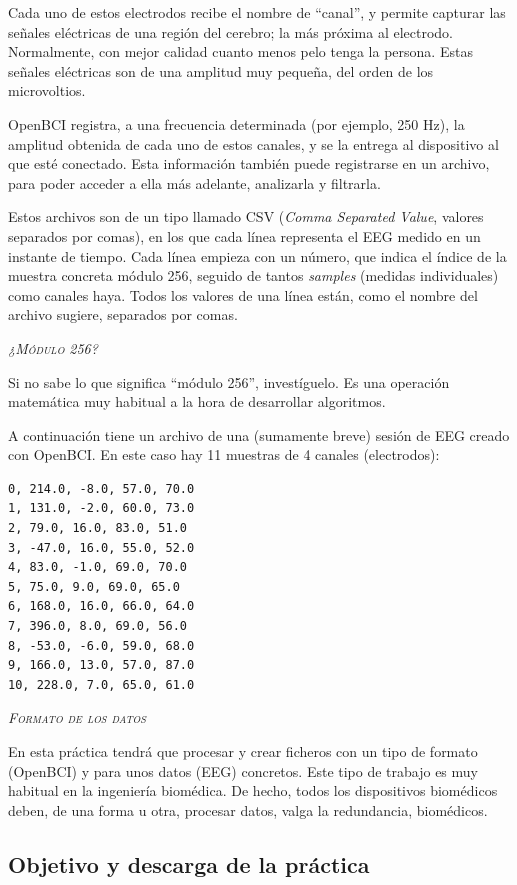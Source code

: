 \documentclass[10pt,a4paper,spanish]{article}
\newcommand{\sombreado}[2]{
  \begin{shaded}
    \begin{center} \emph{\textsc{#1}} \end{center}
    \noindent #2\\
  \end{shaded}
}
\begin{document}
Cada uno de estos electrodos recibe el nombre de ``canal'', y permite capturar las señales eléctricas de una región del cerebro; la más próxima al electrodo. Normalmente, con mejor calidad cuanto menos pelo tenga la persona. Estas señales eléctricas son de una amplitud muy pequeña, del orden de los microvoltios.

OpenBCI registra, a una frecuencia determinada (por ejemplo, 250 Hz), la amplitud obtenida de cada uno de estos canales, y se la entrega al dispositivo al que esté conectado. Esta información también puede registrarse en un archivo, para poder acceder a ella más adelante, analizarla y filtrarla.

Estos archivos son de un tipo llamado CSV (\textit{Comma Separated Value}, valores separados por comas), en los que cada línea representa el EEG medido en un instante de tiempo. Cada línea empieza con un número, que indica el índice de la muestra concreta módulo 256, seguido de tantos \textit{samples} (medidas individuales) como canales haya. Todos los valores de una línea están, como el nombre del archivo sugiere, separados por comas.

\sombreado{¿Módulo 256?}{Si no sabe lo que significa ``módulo 256'', investíguelo. Es una operación matemática muy habitual a la hora de desarrollar algoritmos.}

A continuación tiene un archivo de una (sumamente breve) sesión de EEG creado con OpenBCI. En este caso hay 11 muestras de 4 canales (electrodos):

\begin{verbatim}
0, 214.0, -8.0, 57.0, 70.0
1, 131.0, -2.0, 60.0, 73.0
2, 79.0, 16.0, 83.0, 51.0
3, -47.0, 16.0, 55.0, 52.0
4, 83.0, -1.0, 69.0, 70.0
5, 75.0, 9.0, 69.0, 65.0
6, 168.0, 16.0, 66.0, 64.0
7, 396.0, 8.0, 69.0, 56.0
8, -53.0, -6.0, 59.0, 68.0
9, 166.0, 13.0, 57.0, 87.0
10, 228.0, 7.0, 65.0, 61.0
\end{verbatim}

\sombreado{Formato de los datos}{En esta práctica tendrá que procesar y crear ficheros con un tipo de formato (OpenBCI) y para unos datos (EEG) concretos. Este tipo de trabajo es muy habitual en la ingeniería biomédica. De hecho, todos los dispositivos biomédicos deben, de una forma u otra, procesar datos, valga la redundancia, biomédicos.}

\subsection{Objetivo y descarga de la práctica}
\end{document}
